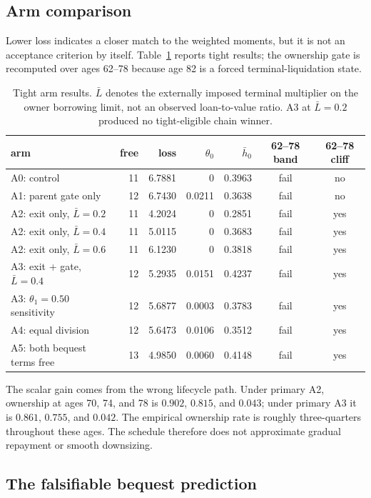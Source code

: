 \documentclass[10pt]{article}
\begin{document}
\subsection{Arm comparison}

Lower loss indicates a closer match to the weighted moments, but it is not an
acceptance criterion by itself. Table~\ref{tab:arms} reports tight results; the
ownership gate is recomputed over ages 62--78 because age 82 is a forced
terminal-liquidation state.

\begin{table}[ht]
\centering
\small
\begin{tabular}{lrrrrcc}
\toprule
arm & free & loss & $\theta_0$ & $\bar h_0$ & 62--78 band & 62--78 cliff \\
\midrule
A0: control & 11 & 6.7881 & 0 & 0.3963 & fail & no \\
A1: parent gate only & 12 & 6.7430 & 0.0211 & 0.3638 & fail & no \\
A2: exit only, $\bar L=0.2$ & 11 & 4.2024 & 0 & 0.2851 & fail & yes \\
A2: exit only, $\bar L=0.4$ & 11 & 5.0115 & 0 & 0.3683 & fail & yes \\
A2: exit only, $\bar L=0.6$ & 11 & 6.1230 & 0 & 0.3818 & fail & yes \\
A3: exit + gate, $\bar L=0.4$ & 12 & 5.2935 & 0.0151 & 0.4237 & fail & yes \\
A3: $\theta_1=0.50$ sensitivity & 12 & 5.6877 & 0.0003 & 0.3783 & fail & yes \\
A4: equal division & 12 & 5.6473 & 0.0106 & 0.3512 & fail & yes \\
A5: both bequest terms free & 13 & 4.9850 & 0.0060 & 0.4148 & fail & yes \\
\bottomrule
\end{tabular}
\caption{Tight arm results. $\bar L$ denotes the externally imposed terminal
multiplier on the owner borrowing limit, not an observed loan-to-value ratio.
A3 at $\bar L=0.2$ produced no tight-eligible chain winner.}
\label{tab:arms}
\end{table}

The scalar gain comes from the wrong lifecycle path. Under primary A2,
ownership at ages 70, 74, and 78 is $0.902$, $0.815$, and $0.043$; under
primary A3 it is $0.861$, $0.755$, and $0.042$. The empirical ownership rate
is roughly three-quarters throughout these ages. The schedule therefore does
not approximate gradual repayment or smooth downsizing.

\subsection{The falsifiable bequest prediction}
\end{document}
